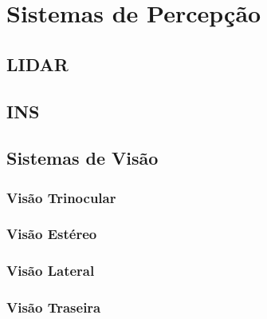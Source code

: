 \section{Sistemas de Percepção}

\subsection{LIDAR}

\subsection{INS}

\subsection{Sistemas de Visão}

\subsubsection{Visão Trinocular}

\subsubsection{Visão Estéreo}

\subsubsection{Visão Lateral}

\subsubsection{Visão Traseira}